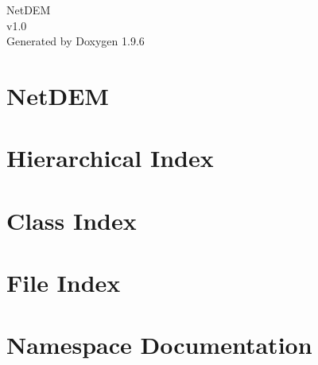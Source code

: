 \documentclass[twoside]{book}
\newcommand{\+}{\discretionary{\mbox{\scriptsize$\hookleftarrow$}}{}{}}
\newcommand{\clearemptydoublepage}{%
    \newpage{\pagestyle{empty}\cleardoublepage}%
  }
\begin{document}
  \raggedbottom
    \hypersetup{pageanchor=false,
                bookmarksnumbered=true,
                pdfencoding=unicode
               }
  \begin{titlepage}
  \vspace*{7cm}
  \begin{center}%
  {\Large Net\+DEM}\\
  [1ex]\large v1.\+0 \\
  \vspace*{1cm}
  {\large Generated by Doxygen 1.9.6}\\
  \end{center}
  \end{titlepage}
  \clearemptydoublepage
  \tableofcontents
  \clearemptydoublepage
  \hypersetup{pageanchor=true}
\chapter{Net\+DEM}
\label{index}\hypertarget{index}{}
\chapter{Hierarchical Index}

\chapter{Class Index}

\chapter{File Index}

\chapter{Namespace Documentation}

\end{document}
